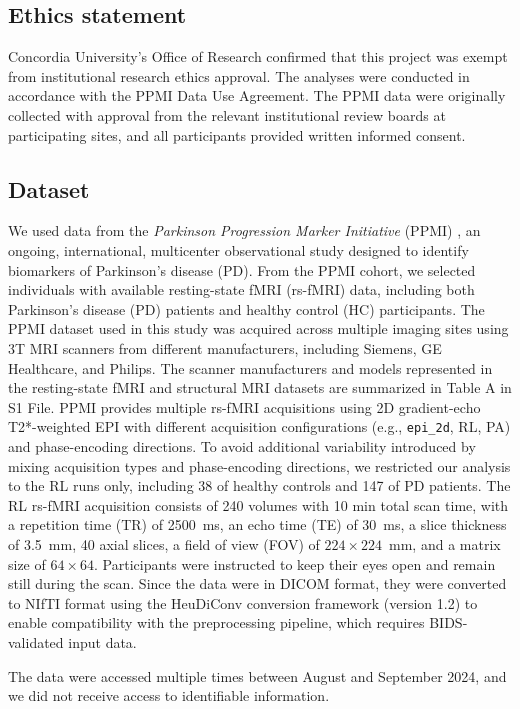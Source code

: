 \subsection{Ethics statement}
Concordia University's Office of Research confirmed that this project was
exempt from institutional research ethics approval. The analyses were
conducted in accordance with the PPMI Data Use Agreement. The PPMI data were
originally collected with approval from the relevant institutional review
boards at participating sites, and all participants provided written informed
consent.


\subsection{Dataset}
We used data from the \textit{Parkinson Progression Marker Initiative} (PPMI) \cite{PPMI2011}, an ongoing, international, multicenter observational study designed to identify biomarkers of Parkinson’s disease (PD). From the PPMI cohort, we selected individuals with available resting-state fMRI (rs-fMRI) data, including both Parkinson’s disease (PD) patients and healthy control (HC) participants.
The PPMI dataset used in this study was acquired across multiple imaging sites using 3T MRI scanners from different manufacturers, including Siemens, GE Healthcare, and Philips. The scanner manufacturers and models represented in the resting-state fMRI and structural MRI datasets are summarized in Table A in S1 File.
PPMI provides multiple rs-fMRI acquisitions using 2D gradient-echo T2*-weighted EPI with different acquisition configurations (e.g., \texttt{epi\_2d}, RL, PA) and phase-encoding directions. To avoid additional variability introduced by mixing acquisition types and phase-encoding directions, we restricted our analysis to the RL runs only, including 38 of healthy controls and 147 of PD patients. The RL rs-fMRI acquisition consists of 240 volumes with 10 min total scan time, with a repetition time (TR) of 2500~ms, an echo time (TE) of 30~ms, a slice thickness of 3.5~mm, 40 axial slices, a field of view (FOV) of $224 \times 224$~mm, and a matrix size of $64 \times 64$. Participants were instructed to keep their eyes open and remain still during the scan.
Since the data were in DICOM format, they were converted to NIfTI format using the HeuDiConv conversion framework (version 1.2) to enable compatibility with the preprocessing pipeline, which requires BIDS-validated input data.

The data were accessed multiple times between August and  September 2024, and we did not receive access to identifiable information.
